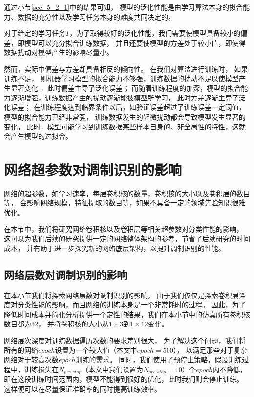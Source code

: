 通过小节\ref{sec_5_2_1}中的结果可知，
模型的泛化性能是由学习算法本身的拟合能力、数据的充分性以及学习任务本身的难度共同决定的。

对于给定的学习任务$T$，为了取得较好的泛化性能，我们需要使模型具备较小的偏差，即模型可以充分拟合训练数据，
并且还要使模型的方差处于较小值，即使得数据扰动对模型产生的影响尽量小。\par

然而，实际中偏差与方差却具备相反的倾向性。
在我们对算法进行训练时，
如果训练不足， 则机器学习模型的拟合能力不够强，训练数据的扰动不足以使模型产生显著变化
，此时偏差主导了泛化误差；
而随着训练程度的加深，模型的拟合能力逐渐增强，训练数据产生的扰动逐渐能被模型所学习，
此时方差逐渐主导了泛化误差；
在训练程度达到临界条件以后，如验证误差超过了训练误差一定阈值，模型的拟合能力已经非常强，
训练数据发生的轻微扰动都会导致模型发生显著的变化，
此时，模型可能学习到训练数据某些样本自身的、非全局性的特性，这就会产生模型的过拟合。\par

\section{网络超参数对调制识别的影响}
网络的超参数，如学习速率，每层卷积核的数量，卷积核的大小以及卷积层的数目等，
会影响网络规模，特征提取的数目等，如果不具备一定的领域先验知识很难优化。\par

在本节中，我们将研究网络卷积核以及卷积层等相关超参数对分类性能的影响，
这可以为我们后续的研究提供一定的网络整体架构的参考，节省了后续研究的时间成本，
并有助于进一步探究新的网络底层架构，以提升调制识别的性能。\par

\subsection{网络层数对调制识别的影响}

在本小节我们将探索网络层数对调制识别的影响。
由于我们仅仅是探索卷积层深度对分类性能的影响，而且网络的训练本身是一个非常耗时的过程。
因此，为了降低时间成本并简化分析提供一个定性的结果，我们在本小节中的仿真所有卷积核数目都为$32$，
并将卷积核的大小从$1\times3$到$1\times12$变化。\par
网络层次深度对训练数据遍历次数的要求差别很大，
为了解决这个问题，我们将所有的网络$epoch$设置为一个较大值（本文中$epoch=500$），
以满足那些对于复杂网络对于较高次数$epoch$训练的需求。
同时，我们使用了预停止策略，假设训练过程中，训练损失在$N_{pre\_stop}$（本文中我们设置为$N_{pre\_stop}=10$）个$epoch$内不降低，
即在这段训练时间范围内，模型不能得到很好的优化，此时我们则会停止训练。
这样便可以在尽量保证准确率的同时提高训练效率。\par

